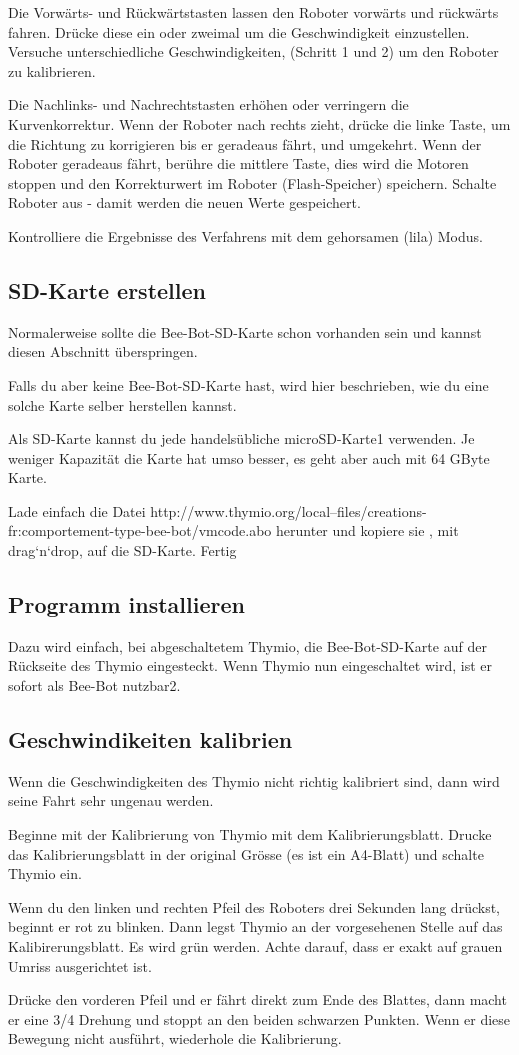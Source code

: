 \documentclass[12pt]{article}
\begin{document}
Die Vorwärts- und Rückwärtstasten lassen den Roboter vorwärts und rückwärts fahren. Drücke diese ein oder zweimal um die Geschwindigkeit einzustellen. Versuche unterschiedliche Geschwindigkeiten, (Schritt 1 und 2) um den Roboter zu kalibrieren. 

Die Nachlinks- und Nachrechtstasten erhöhen oder verringern die Kurvenkorrektur. Wenn der Roboter nach rechts zieht, drücke die linke Taste, um die Richtung zu korrigieren bis er geradeaus fährt, und umgekehrt. 
Wenn der Roboter geradeaus fährt, berühre die mittlere Taste, dies wird die Motoren stoppen und den Korrekturwert im Roboter (Flash-Speicher) speichern. 
Schalte Roboter aus - damit werden die neuen Werte gespeichert. 

Kontrolliere die Ergebnisse des Verfahrens mit dem gehorsamen (lila) Modus. 

\subsection*{SD-Karte erstellen}
Normalerweise sollte die Bee-Bot-SD-Karte schon vorhanden sein und kannst diesen Abschnitt überspringen.
 
Falls du aber keine Bee-Bot-SD-Karte hast, wird hier beschrieben, wie du eine solche Karte selber herstellen kannst.

Als SD-Karte kannst du jede handelsübliche microSD-Karte1 verwenden. Je weniger Kapazität die Karte hat umso besser, es geht aber auch mit 64 GByte Karte.

Lade einfach die Datei http://www.thymio.org/local--files/creations-fr:comportement-type-bee-bot/vmcode.abo herunter und kopiere sie , mit drag‘n‘drop, auf die SD-Karte. Fertig

\subsection*{Programm installieren}
Dazu wird einfach, bei abgeschaltetem Thymio, die Bee-Bot-SD-Karte auf der Rückseite des Thymio eingesteckt. Wenn Thymio nun eingeschaltet wird, ist er sofort als Bee-Bot nutzbar2. 

\subsection*{Geschwindikeiten kalibrien}
Wenn die Geschwindigkeiten des Thymio nicht richtig kalibriert sind,  dann wird seine Fahrt sehr ungenau werden.

Beginne mit der Kalibrierung von Thymio mit dem Kalibrierungsblatt. Drucke das Kalibrierungsblatt in der original Grösse (es ist ein A4-Blatt) und schalte Thymio ein.

Wenn du den linken und rechten Pfeil des Roboters drei Sekunden lang drückst, beginnt er rot zu blinken. Dann legst Thymio an der vorgesehenen Stelle auf das Kalibirerungsblatt. Es wird grün werden. Achte darauf, dass er exakt auf grauen Umriss ausgerichtet ist.

Drücke den vorderen Pfeil und er fährt direkt zum Ende des Blattes, dann macht er eine 3/4 Drehung und stoppt an den beiden schwarzen Punkten. Wenn er diese Bewegung nicht ausführt, wiederhole die Kalibrierung.
\end{document}
